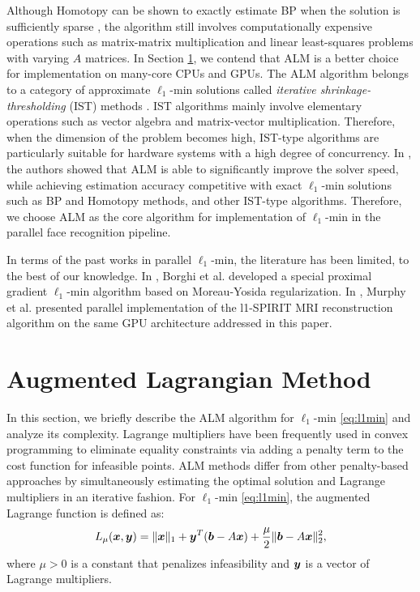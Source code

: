 \documentclass[10pt,twocolumn,letterpaper]{article}
\begin{document}
Although Homotopy can be shown to exactly estimate BP when the solution is
sufficiently sparse \cite{DonohoD2006}, the algorithm still involves
computationally expensive operations such as matrix-matrix multiplication and
linear least-squares problems with varying $A$
matrices.
In Section \ref{sec:ALM}, we contend that ALM is a better choice for
implementation on many-core CPUs and GPUs. The ALM algorithm belongs to a
category of approximate $\ell_1$-min solutions called \emph{iterative
shrinkage-thresholding} (IST) methods \cite{WrightS2008,BeckA2009}.  IST
algorithms mainly involve elementary operations such as vector algebra and
matrix-vector multiplication. Therefore, when the dimension of the problem
becomes high, IST-type algorithms are particularly suitable for hardware
systems with a high degree of concurrency. In \cite{YangA2010-ICIP}, the
authors showed that ALM is able to significantly improve the solver speed,
while achieving estimation accuracy competitive with exact $\ell_1$-min
solutions such as BP and Homotopy methods, and other IST-type
algorithms. Therefore, we choose ALM as the core algorithm for
implementation of $\ell_1$-min in the parallel face recognition pipeline.

In terms of the past works in parallel $\ell_1$-min, the literature has been
limited, to the best of our knowledge. In \cite{BorghiA2010}, Borghi et al.
developed a special proximal gradient $\ell_1$-min algorithm based on
Moreau-Yosida regularization. In \cite{MurphyM2010}, Murphy et al. presented
parallel implementation of the l1-SPIRIT MRI reconstruction algorithm on 
the same GPU architecture addressed in this paper.

\section{Augmented Lagrangian Method}
\label{sec:ALM}

In this section, we briefly describe the ALM algorithm for $\ell_1$-min
\eqref{eq:l1min} \cite{YangA2010-ICIP} and analyze its complexity. Lagrange
multipliers have been frequently used in convex programming to eliminate
equality constraints via adding a penalty term to the cost function for
infeasible points. ALM methods differ from other penalty-based approaches by
simultaneously estimating the optimal solution and Lagrange multipliers in an
iterative fashion.  For $\ell_1$-min \eqref{eq:l1min}, the augmented Lagrange
function is defined as: 
\begin{equation} L_\mu({\boldsymbol{x}},{\boldsymbol{y}}) = \|{\boldsymbol{x}}\|_1 +
{\boldsymbol{y}}^T({\boldsymbol{b}} - A{\boldsymbol{x}}) + \frac{\mu}{2} \| {\boldsymbol{b}}-A{\boldsymbol{x}} \|_2^2, 
\end{equation}
where $\mu > 0$ is a constant that penalizes infeasibility and ${\boldsymbol{y}}$ is a
vector of Lagrange multipliers.
\end{document}
